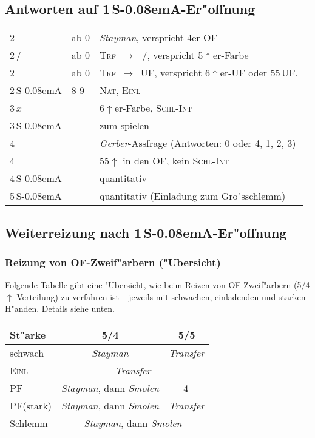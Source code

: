 \documentclass[11pt,german,twocolumn]{scrartcl}
\def\pik{\nobreak\,\Sp\xspace}
\def\coe{\nobreak\,\He\xspace}
\def\kar{\nobreak\,\Di\xspace}
\def\tre{\nobreak\,\Cl\xspace}
\def\pi{\Sp\xspace}
\def\co{\He\xspace}
\def\ra{$\rightarrow$\xspace}
\def\pl{$\uparrow$\xspace}
\def\uf{\nobreak\textsf{\,UF}\xspace}
\def\ufa{\nobreak\textsf{UF}\xspace}
\def\ofa{\nobreak\textsf{OF}\xspace}
\def\sa{\nobreak\textsf{S\kern-0.08emA}\xspace}
\def\SA{\nobreak\,\sa}
\newcommand{\conv}[1]{\emph{#1}}
\def\nat{\textsc{Nat}\xspace}
\def\pf{\textsc{PF}\xspace}
\def\inv{\textsc{Einl}\xspace}
\def\xfer{\textsc{Trf}\xspace}
\def\xferto{\xfer~\ra~}
\def\slamint{\textsc{Schl-Int}\xspace}
\newcommand\bidins[1]%
{%
\begin{flushleft}
\begin{tabularx}{\columnwidth}{llX}%
#1
\end{tabularx}%
\end{flushleft}
}
\newcommand{\Index}[1]{#1\index{#1}}
\begin{document}
\subsection{Antworten auf 1\SA-Er"offnung}
\bidins{%
2\tre & ab 0 & \conv{Stayman}, verspricht 4er-\ofa\\
2\kar/\co & ab 0 & \xferto\coe/\pi, verspricht
5\pl{}er-Farbe\\
2\pik & ab 0 & \xferto\ufa, verspricht 6\pl{}er-\ufa oder
55\uf.\\
2\SA & 8-9 & \nat, \inv\\
3\,$x$ && 6\pl{}er-Farbe, \slamint{}\\
3\SA && zum spielen\\
4\tre && \conv{\Index{Gerber}}-Assfrage (Antworten: 0 oder 4, 1, 2, 3)\\
4\kar && 55\pl in den \ofa, kein \slamint{}\\
4\SA && quantitativ\\
5\SA && quantitativ (Einladung zum Gro"sschlemm)
}

\subsection{Weiterreizung nach 1\SA-Er"offnung}

\subsubsection{Reizung von \ofa-Zweif"arbern ("Ubersicht)}

Folgende Tabelle gibt eine "Ubersicht, wie beim Reizen von
\ofa-Zweif"arbern (5/4\pl-Verteilung) zu verfahren ist -- jeweils mit
schwachen, einladenden und starken H"anden.  Details siehe unten.

\begin{tabular}[t]{|l|c|c|}
\hline
\textbf{St"arke} & \textbf{5/4} & \textbf{5/5}\\
\hline
\hline
schwach & \conv{Stayman} & \conv{Transfer}\\
\hline
\inv & \multicolumn{2}{c|}{\conv{Transfer}}\\
\hline
\pf & \conv{Stayman}, dann \conv{Smolen} & 4\kar\\
\hline
\pf (stark) & \conv{Stayman}, dann \conv{Smolen} & \conv{Transfer}\\
\hline
Schlemm & \multicolumn{2}{c|}{\conv{Stayman}, dann \conv{Smolen}}\\
\hline
\end{tabular}
\end{document}
